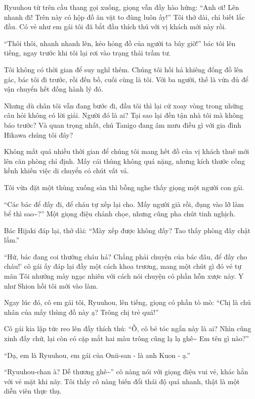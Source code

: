 \documentclass[../main.tex]{subfiles}
\begin{document}
Ryuuhou từ trên cầu thang gọi xuống, giọng vẫn đầy hào hứng: ``Anh ơi! Lên nhanh đi! Trên này có hộp đồ ăn vặt to đùng luôn ấy!'' Tôi thở dài, chỉ biết lắc đầu. Có vẻ như em gái tôi đã bắt đầu thích thú với vị khách mới này rồi.

``Thôi thôi, nhanh nhanh lên, kẻo hỏng đồ của người ta bây giờ!'' bác tôi lên tiếng, ngay trước khi tôi lại rơi vào trạng thái trầm tư.

Tôi không có thời gian để suy nghĩ thêm. Chúng tôi hối hả khiêng đống đồ lên gác, bác tôi đi trước, rồi đến bố, cuối cùng là tôi. Với ba người, thế là vừa đủ để vận chuyển hết đống hành lý đó.

Nhưng dù chân tôi vẫn đang bước đi, đầu tôi thì lại cứ xoay vòng trong những câu hỏi không có lời giải. Người đó là ai? Tại sao lại đến tận nhà tôi mà không báo trước? Và quan trọng nhất, chú Tanigo đang âm mưu điều gì với gia đình Hikawa chúng tôi đây?

\ct


Không mất quá nhiều thời gian để chúng tôi mang hết đồ của vị khách thuê mới lên căn phòng chỉ định. Mấy cái thùng không quá nặng, nhưng kích thước cồng kềnh khiến việc di chuyển có chút vất vả.

Tôi vừa đặt một thùng xuống sàn thì bỗng nghe thấy giọng một người con gái.

``Các bác để đấy đi, để cháu tự xếp lại cho. Mấy người già rồi, đụng vào lỡ làm bể thì sao\~{}?'' Một giọng điệu chảnh chọe, nhưng cũng pha chút tinh nghịch.

Bác Hijaki đáp lại, thở dài: ``Mày xếp được không đấy? Tao thấy phòng đây chật lắm.''

``Hứ, bác đang coi thường cháu hả? Chẳng phải chuyện của bác đâu, để đấy cho cháu!' cô gái ấy đáp lại đầy một cách khoa trương, mang một chút gì đó vẻ tự mãn Tôi nhướng mày ngạc nhiên với cách nói chuyện có phần hỗn xược này. Y như Shion hồi tôi mới vào làm.

Ngay lúc đó, cô em gái tôi, Ryuuhou, lên tiếng, giọng có phần tò mò: ``Chị là chủ nhân của mấy thùng đồ này ạ? Trông chị trẻ quá!''

Cô gái kia lập tức reo lên đầy thích thú: ``Ồ, cô bé tóc ngắn này là ai? Nhìn cũng xinh đấy chứ, lại còn có cặp mắt hai màu trông cũng lạ lạ ghê\~{} Em tên gì nào?''

``Dạ, em là Ryuuhou, em gái của Onii-san - là anh Kuon - ạ.''

``Ryuuhou-chan à? Dễ thương ghê\~{}'' cô nàng nói với giọng điệu vui vẻ, khác hẳn với vẻ mặt khi nãy. Tôi thấy cô nàng biến đổi thái độ quá nhanh, thật là một diễn viên thực thụ.
\end{document}
